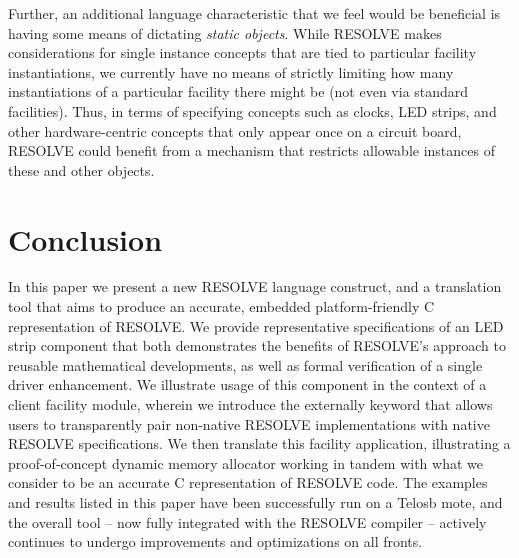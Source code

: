 Further, an additional language characteristic that we feel would be beneficial is having some means of dictating \textit{static objects}. While RESOLVE makes considerations for single instance concepts that are tied to particular facility instantiations, we currently have no means of strictly limiting how many instantiations of a particular facility there might be (not even via standard facilities). Thus, in terms of specifying concepts such as clocks, LED strips, and other hardware-centric concepts that only appear once on a circuit board, RESOLVE could benefit from a mechanism that restricts allowable instances of these and other objects. 

\section{Conclusion}

In this paper we present a new RESOLVE language construct, and a translation tool that aims to produce an accurate, embedded platform-friendly C representation of RESOLVE. We provide representative specifications of an LED strip component that both demonstrates the benefits of RESOLVE's approach to reusable mathematical developments, as well as formal verification of a single driver enhancement. We illustrate usage of this component in the context of a client facility module, wherein we introduce the externally keyword that allows users to transparently pair non-native RESOLVE implementations with native RESOLVE specifications. We then translate this facility application, illustrating a proof-of-concept dynamic memory allocator working in tandem with what we consider to be an accurate C representation of RESOLVE code. The examples and results listed in this paper have been successfully run on a Telosb mote, and the overall tool -- now fully integrated with the RESOLVE compiler -- actively continues to undergo improvements and optimizations on all fronts.

